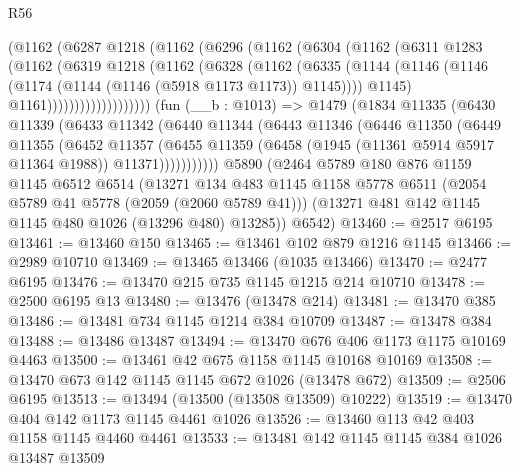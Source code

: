 \begin{lexlean}{R56}
\begin{coremodule}
              (@1162
                (@6287
                  @1218
                  (@1162
                    (@6296
                      (@1162
                        (@6304
                          (@1162
                            (@6311
                              @1283
                              (@1162
                                (@6319
                                  @1218
                                  (@1162
                                    (@6328
                                      (@1162
                                        (@6335
                                          (@1144
                                            (@1146
                                              (@1146
                                                (@1174 (@1144 (@1146 (@5918 @1173 @1173)) @1145))))
                                            @1145)
                                          @1161)))))))))))))))))))
    (fun (__b : @1013) =>
    @1479
      (@1834
        @11335
        (@6430
          @11339
          (@6433
            @11342
            (@6440
              @11344
              (@6443
                @11346
                (@6446
                  @11350
                  (@6449
                    @11355
                    (@6452
                      @11357
                      (@6455
                        @11359
                        (@6458 (@1945 (@11361 @5914 @5917 @11364 @1988)) @11371)))))))))))
    @5890
    (@2464
      @5789
      @180
      @876
      @1159
      @1145
      @6512
      @6514
      (@13271
        @134
        @483
        @1145
        @1158
        @5778
        @6511
        (@2054 @5789 @41 @5778 (@2059 (@2060 @5789 @41)))
        (@13271 @481 @142 @1145 @1145 @480 @1026 (@13296 @480) @13285))
      @6542)
@13460 := @2517 @6195
@13461 := @13460 @150
@13465 := @13461 @102 @879 @1216 @1145
@13466 := @2989 @10710
@13469 := @13465 @13466 (@1035 @13466)
@13470 := @2477 @6195
@13476 := @13470 @215 @735 @1145 @1215 @214 @10710
@13478 := @2500 @6195 @13
@13480 := @13476 (@13478 @214)
@13481 := @13470 @385
@13486 := @13481 @734 @1145 @1214 @384 @10709
@13487 := @13478 @384
@13488 := @13486 @13487
@13494 := @13470 @676 @406 @1173 @1175 @10169 @4463
@13500 := @13461 @42 @675 @1158 @1145 @10168 @10169
@13508 := @13470 @673 @142 @1145 @1145 @672 @1026 (@13478 @672)
@13509 := @2506 @6195
@13513 := @13494 (@13500 (@13508 @13509) @10222)
@13519 := @13470 @404 @142 @1173 @1145 @4461 @1026
@13526 := @13460 @113 @42 @403 @1158 @1145 @4460 @4461
@13533 := @13481 @142 @1145 @1145 @384 @1026 @13487 @13509

\end{coremodule}
\end{lexlean}
